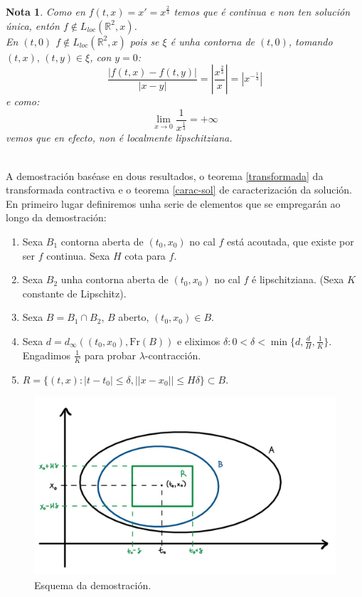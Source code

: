 \documentclass[11pt, a4paper,twoside]{article}
\makeatletter
\theoremstyle{theorem-style}  %
\renewenvironment{proof}[1][\proofname]{\par
	\pushQED{\qed}%
	\normalfont \topsep6\p@\@plus6\p@\relax
	\list{}{%
		\settowidth{\leftmargin}{\quad:\hskip\labelsep}%
		\setlength{\labelwidth}{0pt}%
		\setlength{\itemindent}{-\leftmargin}%
	}%
	\item[\hskip\labelsep\itshape#1\@addpunct{:}]\ignorespaces
}{%
	\popQED\endlist\@endpefalse
}
\theoremstyle{definition-style}
\newtheorem*{note}{Nota} %
\theoremstyle{example-style}
\providecommand{\abs}[1]{\left\lvert#1\right\rvert} %
\makeatother
\begin{document}
\begin{note}
	Como en $f(t, x) = x' = x^{\frac{2}{3}}$ temos que é continua e non ten solución única, entón $f \notin L_{loc}(\mathbb{R}^2,x)$. \\
	En $(t, 0)$ $f \notin L_{loc}(\mathbb{R}^2,x)$ pois se $\xi$ é unha contorna de $(t, 0)$, tomando $(t, x), \, (t, y) \in \xi$, con $y=0$:
	\[\frac{\abs{f(t, x) - f(t, y)}}{\abs{x - y}} = \abs{\frac{x^{\frac{2}{3}}}{x}} = \abs{x^{-\frac{1}{3}}}\]
	e como:
	\[\lim\limits_{x \to 0} \frac{1}{x^{\frac{1}{3}}} = +\infty\] 
	vemos que en efecto, non é localmente lipschitziana.
\end{note}
\begin{proof}\ \\
	A demostración baséase en dous resultados, o teorema \ref{transformada} da transformada contractiva e o teorema \ref{carac-sol} de caracterización da solución. En primeiro lugar definiremos unha serie de elementos que se empregarán ao longo da demostración:
	\begin{enumerate}
		\item Sexa $ B_1 $  contorna aberta de $ (t_0,x_0) $ no cal $ f $ está acoutada, que existe por ser $ f $ continua. Sexa $ H $ cota para $ f $.
		
		\item Sexa $ B_2 $ unha contorna aberta de $ (t_0,x_0) $ no cal $ f $ é lipschitziana. (Sexa $ K $ constante de Lipschitz).
		
		\item Sexa $ B=B_1 \cap B_2 $, $ B $ aberto, $ (t_0,x_0) \in B$.
		
		\item Sexa $ d=d_\infty((t_0,x_0),\text{Fr}(B)) $ e eliximos $ \delta : 0<\delta <\min \{d,\frac{d}{H},\frac{1}{K}\} $. Engadimos $ \frac{1}{K} $ para probar $ \lambda $-contracción.
		\item  $ R=\{(t,x) : |t-t_0|\leq \delta, ||x-x_0||\leq H\delta \}\subset B $.
	\end{enumerate}
	
	\begin{figure}[h]
		\centering
		\includegraphics[scale=0.3]{picard}
		\caption{Esquema da demostración.}
	\end{figure}
	

\end{proof}
\end{document}
